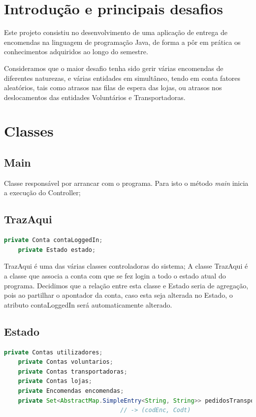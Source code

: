 \documentclass[a4paper]{report}
\begin{document}
	\tableofcontents
	
	\pagebreak
	
	\chapter{Introdução e principais desafios}
%	
	Este projeto consistiu no desenvolvimento de uma aplicação de entrega de encomendas na linguagem de programação Java, de forma a pôr em prática os conhecimentos adquiridos ao longo do semestre. 
	
	Consideramos que o maior desafio tenha sido gerir várias encomendas de diferentes naturezas, e várias entidades em simultâneo, tendo em conta fatores aleatórios, tais como atrasos nas filas de espera das lojas, ou atrasos nos deslocamentos das entidades Voluntários e Transportadoras.
	
	\chapter{Classes}
	\section{Main}
	Classe responsável por arrancar com o programa. Para isto o método \textit{main} inicia a execução do Controller;
	
	\section{TrazAqui}
	\begin{lstlisting}[language=Java]
	private Conta contaLoggedIn;
	private Estado estado;
	\end{lstlisting}
	TrazAqui é uma das várias classes controladoras do sistema;
	A classe TrazAqui é a classe que associa a conta com que se fez login a todo o estado atual do programa. Decidimos que a relação entre esta classe e Estado seria de agregação, pois ao partilhar o apontador da conta, caso esta seja alterada no Estado, o atributo contaLoggedIn será automaticamente alterado.
	\section{Estado}
	\begin{lstlisting}[language=Java]
	private Contas utilizadores;
	private Contas voluntarios;
	private Contas transportadoras;
	private Contas lojas;
	private Encomendas encomendas;
	private Set<AbstractMap.SimpleEntry<String, String>> pedidosTransporte;
								 // -> (codEnc, Codt)
	\end{lstlisting}
	
\end{document}
